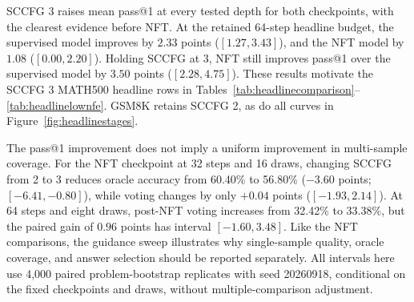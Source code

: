 

SCCFG 3 raises mean pass@1 at every tested depth for both checkpoints, with the clearest evidence before NFT. At the retained 64-step headline budget, the supervised model improves by $2.33$ points ($[1.27,3.43]$), and the NFT model by $1.08$ ($[0.00,2.20]$). Holding SCCFG at 3, NFT still improves pass@1 over the supervised model by $3.50$ points ($[2.28,4.75]$). These results motivate the SCCFG 3 MATH500 headline rows in Tables~\ref{tab:headlinecomparison}--\ref{tab:headlinelownfe}. GSM8K retains SCCFG 2, as do all curves in Figure~\ref{fig:headlinestages}.

The pass@1 improvement does not imply a uniform improvement in multi-sample coverage. For the NFT checkpoint at 32 steps and 16 draws, changing SCCFG from 2 to 3 reduces oracle accuracy from 60.40\% to 56.80\% ($-3.60$ points; $[-6.41,-0.80]$), while voting changes by only $+0.04$ points ($[-1.93,2.14]$). At 64 steps and eight draws, post-NFT voting increases from 32.42\% to 33.38\%, but the paired gain of $0.96$ points has interval $[-1.60,3.48]$. Like the NFT comparisons, the guidance sweep illustrates why single-sample quality, oracle coverage, and answer selection should be reported separately. All intervals here use 4,000 paired problem-bootstrap replicates with seed 20260918, conditional on the fixed checkpoints and draws, without multiple-comparison adjustment.
